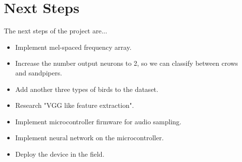 \documentclass{article}
\begin{document}
\section{Next Steps}
The next steps of the project are...

\begin{itemize}
\item Implement mel-spaced frequency array.
\item Increase the number output neurons to 2, so we can classify between crows and sandpipers. 
\item Add another three types of birds to the dataset.
\item Research "VGG like feature extraction".
\item Implement microcontroller firmware for audio sampling.
\item Implement neural network on the microcontroller.
\item Deploy the device in the field.
\end{itemize}
\end{document}
